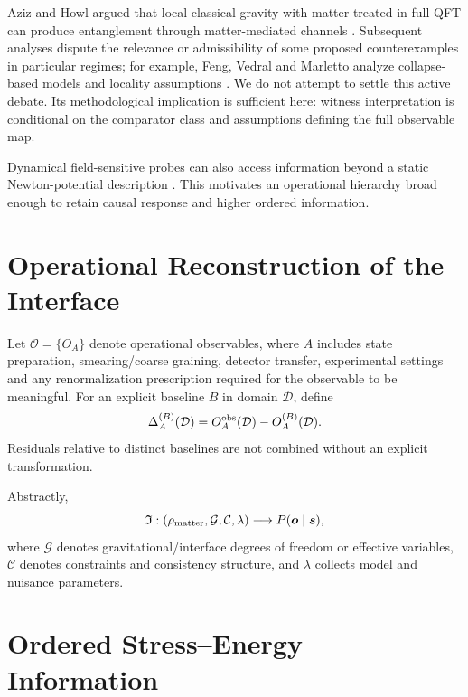 \documentclass[11pt]{article}
\begin{document}
Aziz and Howl argued that local classical gravity with matter treated in full QFT can produce entanglement through matter-mediated channels \cite{AzizHowl2025}. Subsequent analyses dispute the relevance or admissibility of some proposed counterexamples in particular regimes; for example, Feng, Vedral and Marletto analyze collapse-based models and locality assumptions \cite{FengVedralMarletto2026}. We do not attempt to settle this active debate. Its methodological implication is sufficient here: witness interpretation is conditional on the comparator class and assumptions defining the full observable map.

Dynamical field-sensitive probes can also access information beyond a static Newton-potential description \cite{ChenGiacomini2025}. This motivates an operational hierarchy broad enough to retain causal response and higher ordered information.

\section{Operational Reconstruction of the Interface}

Let $\mathcal O=\{O_A\}$ denote operational observables, where $A$ includes state preparation, smearing/coarse graining, detector transfer, experimental settings and any renormalization prescription required for the observable to be meaningful. For an explicit baseline $B$ in domain $\mathcal D$, define
\begin{equation}
 \Delta_A^{(B)}(\mathcal D)
 = O_A^{\rm obs}(\mathcal D)-O_A^{(B)}(\mathcal D).
\end{equation}
Residuals relative to distinct baselines are not combined without an explicit transformation.

Abstractly,
\begin{equation}
 \mathfrak I:(\rho_{\rm matter},\mathcal G,\mathcal C,\lambda)
 \longrightarrow P(\bm{o}\mid\bm{s}),
\end{equation}
where $\mathcal G$ denotes gravitational/interface degrees of freedom or effective variables, $\mathcal C$ denotes constraints and consistency structure, and $\lambda$ collects model and nuisance parameters.

\section{Ordered Stress--Energy Information}
\end{document}
